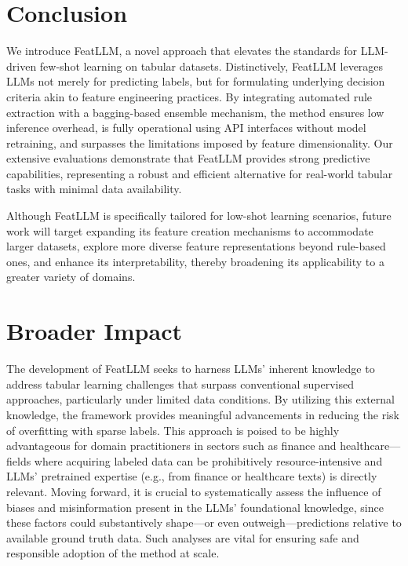 \section{Conclusion}
We introduce \textsf{FeatLLM}, a novel approach that elevates the standards for LLM-driven few-shot learning on tabular datasets. Distinctively, \textsf{FeatLLM} leverages LLMs not merely for predicting labels, but for formulating underlying decision criteria akin to feature engineering practices. By integrating automated rule extraction with a bagging-based ensemble mechanism, the method ensures low inference overhead, is fully operational using API interfaces without model retraining, and surpasses the limitations imposed by feature dimensionality. Our extensive evaluations demonstrate that \textsf{FeatLLM} provides strong predictive capabilities, representing a robust and efficient alternative for real-world tabular tasks with minimal data availability.

Although \textsf{FeatLLM} is specifically tailored for low-shot learning scenarios, future work will target expanding its feature creation mechanisms to accommodate larger datasets, explore more diverse feature representations beyond rule-based ones, and enhance its interpretability, thereby broadening its applicability to a greater variety of domains.

\section{Broader Impact} The development of \textsf{FeatLLM} seeks to harness LLMs’ inherent knowledge to address tabular learning challenges that surpass conventional supervised approaches, particularly under limited data conditions. By utilizing this external knowledge, the framework provides meaningful advancements in reducing the risk of overfitting with sparse labels. This approach is poised to be highly advantageous for domain practitioners in sectors such as finance and healthcare—fields where acquiring labeled data can be prohibitively resource-intensive and LLMs’ pretrained expertise (e.g., from finance or healthcare texts) is directly relevant. Moving forward, it is crucial to systematically assess the influence of biases and misinformation present in the LLMs’ foundational knowledge, since these factors could substantively shape—or even outweigh—predictions relative to available ground truth data. Such analyses are vital for ensuring safe and responsible adoption of the method at scale.

